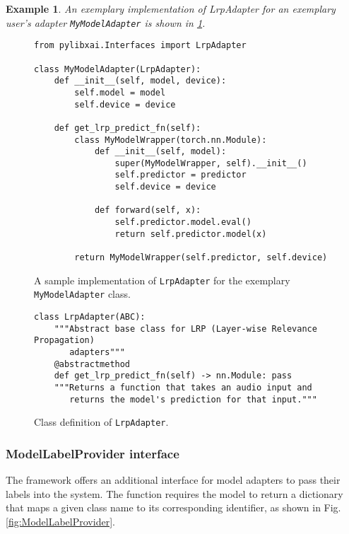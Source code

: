 \documentclass[
    bindingoffset=5mm,  %
    footnoteindent=3mm, %
    hyphenation=true    %
]{src/wut-thesis}
\newtheorem{example}{Example}
\begin{document}
    \begin{example}
        An exemplary implementation of LrpAdapter for an exemplary user's adapter \texttt{MyModelAdapter}
        is shown in \ref{fig:UserAdapterExample}.
    \end{example}

\begin{figure}%
\begin{verbatim}
from pylibxai.Interfaces import LrpAdapter

class MyModelAdapter(LrpAdapter):
    def __init__(self, model, device):
        self.model = model
        self.device = device

    def get_lrp_predict_fn(self):
        class MyModelWrapper(torch.nn.Module):
            def __init__(self, model):
                super(MyModelWrapper, self).__init__()
                self.predictor = predictor
                self.device = device

            def forward(self, x):
                self.predictor.model.eval()
                return self.predictor.model(x)

        return MyModelWrapper(self.predictor, self.device)
\end{verbatim}
\caption{A sample implementation of \texttt{LrpAdapter} for the exemplary \texttt{MyModelAdapter} class.}
\label{fig:UserAdapterExample}
\end{figure}

\begin{figure}%
\begin{verbatim}
class LrpAdapter(ABC):
    """Abstract base class for LRP (Layer-wise Relevance Propagation)
       adapters"""
    @abstractmethod
    def get_lrp_predict_fn(self) -> nn.Module: pass
    """Returns a function that takes an audio input and
       returns the model's prediction for that input."""
\end{verbatim}
\caption{Class definition of \texttt{LrpAdapter}.}
\label{fig:LrpAdapter}
\end{figure}

\subsubsection{ModelLabelProvider interface}

The framework offers an additional interface for model adapters to pass their labels into the system.
The function requires the model to return a dictionary that maps a given class
name to its corresponding identifier, as shown in Fig. \ref{fig:ModelLabelProvider}.
\end{document}

